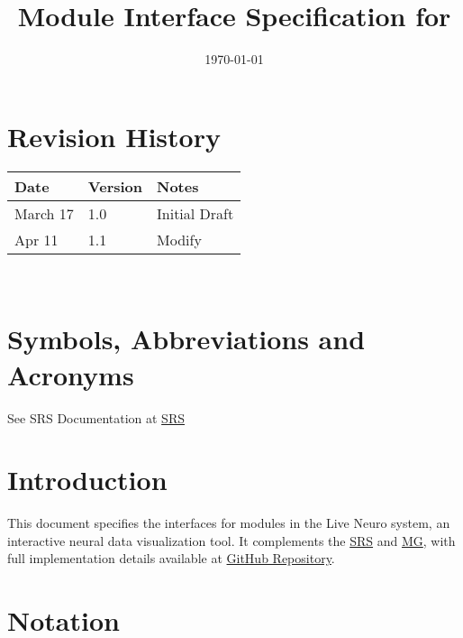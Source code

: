 \documentclass[12pt, titlepage]{article}
\begin{document}
\title{Module Interface Specification for \progname{}}

\author{\authname}

\date{\today}

\maketitle


\section{Revision History}

\begin{tabularx}{\textwidth}{p{3cm}p{2cm}X}
\toprule {\bf Date} & {\bf Version} & {\bf Notes}\\
\midrule
March 17 & 1.0 & Initial Draft\\
Apr 11 & 1.1 & Modify\\
\bottomrule
\end{tabularx}

~\newpage

\section{Symbols, Abbreviations and Acronyms}

See SRS Documentation at \href{https://github.com/liang-bo96/CAS741/blob/main/docs/SRS/SRS.pdf}{SRS}


\newpage

\tableofcontents

\newpage


\section{Introduction}

This document specifies the interfaces for modules in the Live Neuro system, an interactive neural data visualization tool. It complements the
\href{https://github.com/liang-bo96/CAS741/blob/main/docs/SRS/SRS.pdf}{SRS}
and \href{https://github.com/liang-bo96/CAS741/blob/main/docs/Design/SoftArchitecture/MG.pdf}{MG}, with full implementation details available at
\href{https://github.com/liang-bo96/CAS741}{ GitHub Repository}.

\section{Notation}
\end{document}
